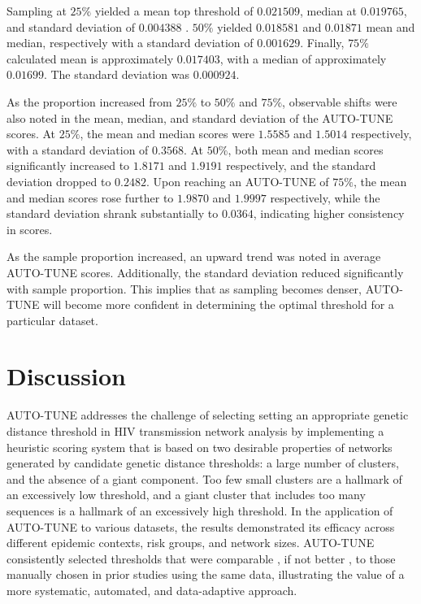 \documentclass[utf8]{FrontiersinHarvard} %
\newcommand{\TODO}[1]{{\color{red}{#1}}}
\begin{document}
Sampling at $25\%$ yielded a mean top threshold of $0.021509$, median at
$0.019765$, and standard deviation of $0.004388$ \label{fig:subsampling}.
$50\%$ yielded $0.018581$ and $0.01871$ mean and median, respectively with a
standard deviation of $0.001629$. Finally, $75\%$ calculated mean is
approximately $0.017403$, with a median of approximately $0.01699$. The
standard deviation was $0.000924$.

\TODO{explain why the trend of HIGHER thresholds for the SPARSER sampling makes sense}

As the proportion increased from $25\%$ to $50\%$ and $75\%$, observable shifts
were also noted in the mean, median, and standard deviation of the AUTO-TUNE
scores. At $25\%$, the mean and median scores were $1.5585$ and $1.5014$
respectively, with a standard deviation of $0.3568$. At $50\%$, both mean and
median scores significantly increased to $1.8171$ and $1.9191$ respectively,
and the standard deviation dropped to $0.2482$. Upon reaching an AUTO-TUNE of
$75\%$, the mean and median scores rose further to $1.9870$ and $1.9997$
respectively, while the standard deviation shrank substantially to $0.0364$,
indicating higher consistency in scores.

As the sample proportion increased, an upward trend was noted in average
AUTO-TUNE scores. Additionally, the standard deviation reduced significantly
with sample proportion. This implies that as sampling becomes denser, AUTO-TUNE
will become more confident in determining the optimal threshold for a
particular dataset.

\TODO{I still think that being able to show what fraction of the nodes connected in the full network are connected in the subsampled networks;
	if you have network JSONs, I can check that pretty quickly}


\section{Discussion}

AUTO-TUNE addresses the challenge of selecting setting an appropriate genetic
distance threshold in HIV transmission network analysis by implementing a
heuristic scoring system that is based on two desirable properties of networks
generated by candidate genetic distance thresholds: a large number of clusters,
and the absence of a giant component. Too few small clusters are a hallmark of
an excessively low threshold, and a giant cluster that includes too many
sequences is a hallmark of an excessively high threshold. In the application of
AUTO-TUNE to various datasets, the results demonstrated its efficacy across
different epidemic contexts, risk groups, and network sizes. \TODO{Not sure
	what efficacy means} AUTO-TUNE consistently selected thresholds that were
comparable \TODO{comparable how?}, if not better \TODO{better how?}, to those
manually chosen in prior studies using the same data, illustrating the value of
a more systematic, automated, and data-adaptive approach.
\end{document}
